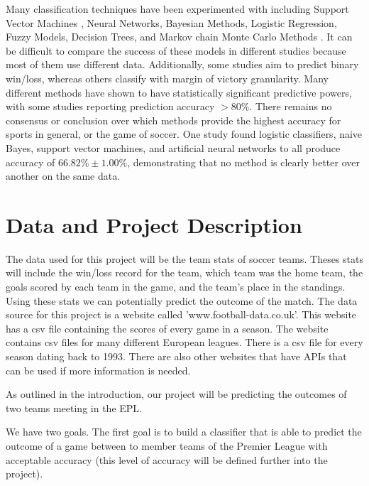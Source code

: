 \documentclass[conference]{IEEEtran}
\begin{document}
 Many classification techniques have been experimented with including Support Vector Machines \cite{Cao:2012aa}, Neural Networks\cite{McCabe:2008aa}, Bayesian Methods\cite{Buursma:2011aa}, Logistic Regression\cite{Cao:2012aa,Buursma:2011aa}, Fuzzy Models\cite{Trawinski:2010aa}, Decision Trees\cite{Zdravevski:2010aa}, and Markov chain Monte Carlo Methods \cite{Rue:2000aa}. It can be difficult to compare the success of these models in different studies because most of them use different data. Additionally, some studies aim to predict binary win/loss, whereas others \cite{Rotshtein:2005aa} classify with margin of victory granularity. Many different methods have shown to have statistically significant predictive powers, with some studies reporting prediction accuracy $>80\%$\cite{Ivankovic:2010aa}. There remains no consensus or conclusion over which methods provide the highest accuracy for sports in general, or the game of soccer. One study \cite{Cao:2012aa} found logistic classifiers, naive Bayes, support vector machines, and artificial neural networks to all produce accuracy of $66.82\% \pm 1.00\%$, demonstrating that no method is clearly better over another on the same data.

\section{Data and Project Description}
The data used for this project will be the team stats of soccer teams. Theses stats will include the win/loss record for the team, which team was the home team, the goals scored by each team in the game, and the team's place in the standings. Using these stats we can potentially predict the outcome of the match.
The data source for this project is a website called 'www.football-data.co.uk'\cite{football_data}. This website has a csv file containing the scores of every game in a season. The website contains csv files for many different European leagues. There is a csv file for every season dating back to 1993. There are also other websites that have APIs that can be used if more information is needed.

As outlined in the introduction, our project will be predicting the outcomes of two teams meeting in the EPL.

We have two goals. The first goal is to build a classifier that is  able to predict the outcome of a game between to member teams of the Premier League with acceptable accuracy (this level of accuracy will be defined further into the project).
\end{document}
